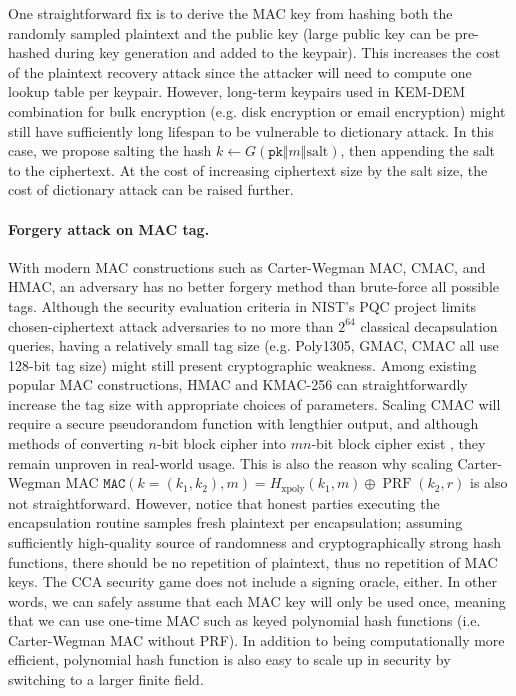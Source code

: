 \documentclass[runningheads]{llncs}
\newcommand{\mac}{\texttt{MAC}}
\newcommand{\pk}{\texttt{pk}}
\begin{document}
One straightforward fix is to derive the MAC key from hashing both the randomly sampled plaintext and the public key (large public key can be pre-hashed during key generation and added to the keypair). This increases the cost of the plaintext recovery attack since the attacker will need to compute one lookup table per keypair. However, long-term keypairs used in KEM-DEM combination for bulk encryption (e.g. disk encryption or email encryption) might still have sufficiently long lifespan to be vulnerable to dictionary attack. In this case, we propose salting the hash $k \leftarrow G(\pk \Vert m \Vert \text{salt})$, then appending the salt to the ciphertext. At the cost of increasing ciphertext size by the salt size, the cost of dictionary attack can be raised further.

\paragraph{Forgery attack on MAC tag.} With modern MAC constructions such as Carter-Wegman MAC, CMAC, and HMAC, an adversary has no better forgery method than brute-force all possible tags. Although the security evaluation criteria in NIST's PQC project limits chosen-ciphertext attack adversaries to no more than $2^{64}$ classical decapsulation queries, having a relatively small tag size (e.g. Poly1305, GMAC, CMAC all use 128-bit tag size) might still present cryptographic weakness. Among existing popular MAC constructions, HMAC and KMAC-256 can straightforwardly increase the tag size with appropriate choices of parameters. Scaling CMAC will require a secure pseudorandom function with lengthier output, and although methods of converting $n$-bit block cipher into $mn$-bit block cipher exist \cite{DBLP:conf/ctrsa/HaleviR04}, they remain unproven in real-world usage. This is also the reason why scaling Carter-Wegman MAC $\mac(k=(k_1, k_2), m) = H_\text{xpoly}(k_1, m) \oplus \operatorname{PRF}(k_2, r)$ is also not straightforward. However, notice that honest parties executing the encapsulation routine samples fresh plaintext per encapsulation; assuming sufficiently high-quality source of randomness and cryptographically strong hash functions, there should be no repetition of plaintext, thus no repetition of MAC keys. The CCA security game does not include a signing oracle, either. In other words, we can safely assume that each MAC key will only be used once, meaning that we can use one-time MAC such as keyed polynomial hash functions (i.e. Carter-Wegman MAC without PRF). In addition to being computationally more efficient, polynomial hash function is also easy to scale up in security by switching to a larger finite field.
\end{document}
